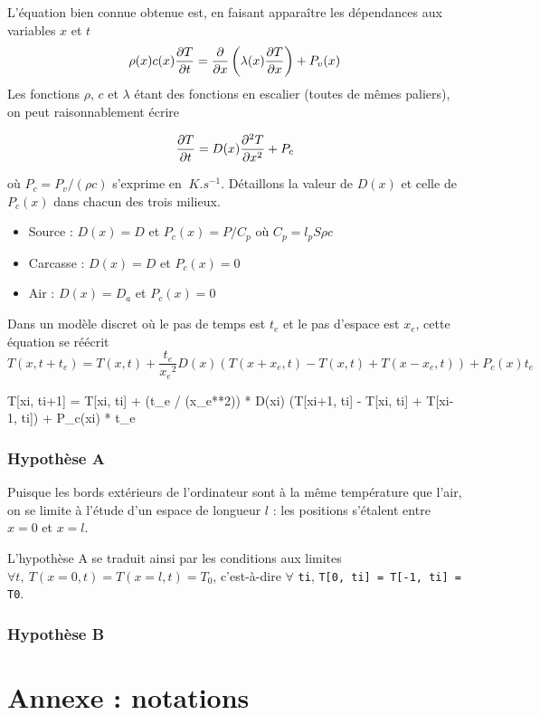 \documentclass{article}
\newcommand{\p}{\texttt} %
\begin{document}
L'équation bien connue obtenue est, en faisant apparaître les dépendances aux variables $x$ et $t$
$$\rho(x) c(x) \pdv{T}{t} = \pdv{x} \left( \lambda (x) \pdv{T}{x} \right) + P_v(x)$$
Les fonctions $\rho$, $c$ et $\lambda$ étant des fonctions en escalier (toutes de mêmes paliers), on peut raisonnablement écrire

$$\pdv{T}{t} = D(x) \pdv[2]{T}{x} + P_c$$

où $P_c = P_v / (\rho c)$ s'exprime en $\SI{}{K.s^{-1}}$. Détaillons la valeur de $D(x)$ et celle de $P_c(x)$ dans chacun des trois milieux.
\begin{itemize}
    \item Source : $D(x) = D$ et $P_c(x) = P / C_p$ où $C_p = l_p S \rho c$
    \item Carcasse : $D(x) = D$ et $P_c(x) = 0$
    \item Air : $D(x) = D_a$ et $P_c(x) = 0$
\end{itemize}

Dans un modèle discret où le pas de temps est $t_e$ et le pas d'espace est $x_e$,  cette équation se réécrit
$$T(x, t+t_e) = T(x, t) + \frac{t_e}{{x_e}^2} D(x)
    \left( T(x+x_e, t) - T(x, t) + T(x-x_e, t) \right)
    + P_c(x) t_e$$

\begin{python}
T[xi, ti+1] = T[xi, ti] + (t_e / (x_e**2)) * D(xi)
    (T[xi+1, ti] - T[xi, ti] + T[xi-1, ti])
    + P_c(xi) * t_e
\end{python}

\subsubsection{Hypothèse A}

Puisque les bords extérieurs de l'ordinateur sont à la même température que l'air, on se limite à l'étude d'un espace de longueur $l$ : les positions s'étalent entre $x = 0$ et $x = l$.

L'hypothèse A se traduit ainsi par les conditions aux limites $\forall t,~T(x=0, t) = T(x=l, t) = T_0$, c'est-à-dire $\forall$ \p{ti}, \p{T[0, ti] = T[-1, ti] = T0}.

\subsubsection{Hypothèse B}


\section*{Annexe : notations}
\end{document}

